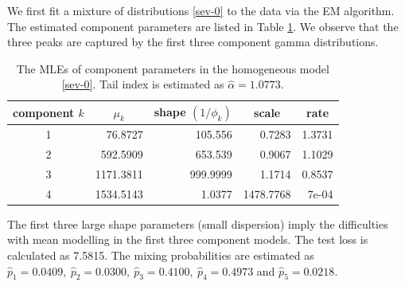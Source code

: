 \documentclass[11pt]{article}
\numberwithin{equation}{section}
\begin{document}
We first fit a mixture of distributions \eqref{sev-0} to the data via the EM algorithm. 
The estimated component parameters are listed in Table \ref{null-gamma}. We observe that the three peaks are captured by the first three component gamma distributions.
	\begin{table}[h!]
		\centering
		\caption{The MLEs of component parameters in the homogeneous model \eqref{sev-0}. Tail index is estimated as $\hat{\alpha}=1.0773$.}\label{null-gamma}
		\begin{tabular}{crrrr}
			\hline
			component $k$ & \multicolumn{1}{c}{$\mu_k$} & \multicolumn{1}{c}{shape $(1/\phi_k)$} & \multicolumn{1}{c}{scale} & \multicolumn{1}{c}{rate} \\ \hline
			1         & 76.8727                & 105.556                   & 0.7283                    & 1.3731                   \\
			2         & 592.5909               & 653.539                   & 0.9067                    & 1.1029                   \\
			3         & 1171.3811              & 999.9999                  & 1.1714                    & 0.8537                   \\
			4         & 1534.5143              & 1.0377                    & 1478.7768                 & 7e-04                    \\ \hline
		\end{tabular}
	\end{table}
	The first three large shape parameters (small dispersion) imply the  difficulties with {mean modelling} in the first three component models.
	 The test loss is calculated as 7.5815. The mixing probabilities are estimated as $\hat{p}_1=0.0409,~ \hat{p}_2=0.0300, ~\hat{p}_3=0.4100,~ \hat{p}_4=0.4973$ and $\hat{p}_5=0.0218.$
\end{document}
